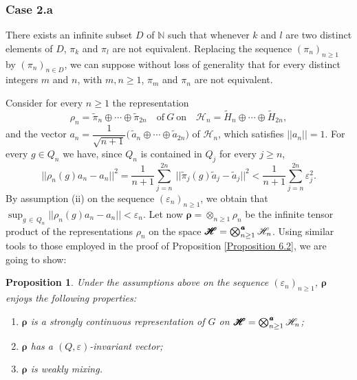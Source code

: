 \documentclass[11pt,english,a4paper]{smfart}
\numberwithin{equation}{section}
\newtheorem{proposition}[theorem]{Proposition}
\theoremstyle{definition}
\begin{document}
 \subsubsection{Case 2.a}\label{Section 6.6.1} There exists an infinite 
subset $D$ of ${\ensuremath{\mathbb N}}$ such that 
whenever $k$ and $l$ are two distinct elements of $D$, $\pi _{k}$ and $\pi 
 _{l}$ are not equivalent. Replacing the sequence $(\pi 
_{n})_{n\ge 1}$ by $(\pi 
_{n})_{n\in D}$, we can 
 suppose without loss of generality 
that for every distinct integers $m$ and $n$, with $m,n\ge 1$, $\pi _{m}$ and $\pi _{n}$ 
are not equivalent.
\par\smallskip 
Consider for every ${n\ge 1}$ the representation
\[
\rho _{n}={\widetilde{{\pi }}}_{n}{\mathop{\oplus}}\cdots{\mathop{\oplus}}{\widetilde{{\pi}}} _{2n}\quad 
\textrm{of}\ G\ \textrm{on}\quad
{\mathscr{H}} _{n}={\widetilde{{H}}}_{n}{\mathop{\oplus}}\cdots{\mathop{\oplus}}{\widetilde{{H}}}_{2n},
\]
and the vector ${a_{n}}=\dfrac{1}{\sqrt{n+1}}\bigl(\,{\widetilde{{a}}}_{n}{\mathop{\oplus}}\cdots{\mathop{\oplus}} 
{\widetilde{{a}}}_{2n} \bigr)$
of ${\mathscr{H}} _{n}$, which satisfies $||{a_{n}}||=1$. For every $g\in {Q_{n}}$ we 
have, since ${Q_{n}}$ is contained in $Q_{j}$ for every $j\ge n$,
\[
||\rho_{n}(g){a_{n}}-{a_{n}}||^{2}=\dfrac{1}{n+1}\sum_{j=n}^{2n}\ 
\bigl|\bigl|{\widetilde{{\pi 
}}}_{j}(g){\widetilde{{a}}}_{j}-{\widetilde{{a}}}_{j}\bigr|\bigr|^{2}<\dfrac{1}{n+1}\sum_{j=n}^{2n}
\varepsilon _{j}^{2}.
\]
By assumption
(ii) on the sequence $({\varepsilon _{n}})_{n\ge 1}$, we obtain that 
$\sup_{g\,\in\,{Q_{n}}}||\rho _{n}(g){a_{n}}-{a_{n}}||<{\varepsilon _{n}}$. Let 
now $\pmb{\rho}
={\otimes}_{n\ge 1}\rho _{n}$ be the infinite tensor product of the representations $\rho 
_{n}$ on the space 
$\pmb{\mathscr{H}} =\bigotimes_{n\ge 1}^{\mkern 1.5 mu\pmb{a}}{\mathscr{H}} _{n}$. Using similar tools 
to those employed in the proof of Proposition \ref{Proposition 6.2}, we 
are going to show:
\begin{proposition}\label{Proposition 6.3}
Under the assumptions above on the sequence $(\varepsilon _{n})_{n\ge 1}$, 
$\pmb{\rho} $ enjoys the 
following properties:
\begin{enumerate}
 \item [{(a)}] $\pmb{\rho}  $ is a strongly continuous 
representation of $G$ 
on 
 $\pmb{\mathscr{H}} =\bigotimes_{n\ge 1}^{\mkern 1.5 mu\pmb{a}}{\mathscr{H}} _{n}$;
 \item[{(b)}] $\pmb{\rho} $ has a $({Q},\varepsilon )$-invariant 
vector;
 \item[{(c)}] $\pmb{\rho} $ is weakly mixing. 
\end{enumerate}
\end{proposition}
\end{document}
